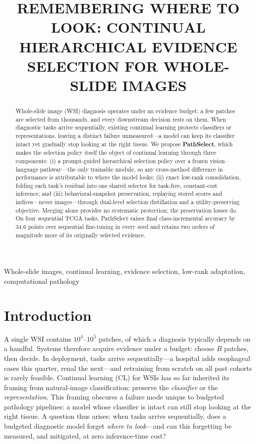 \documentclass{article}
\title{REMEMBERING WHERE TO LOOK: CONTINUAL HIERARCHICAL EVIDENCE SELECTION FOR WHOLE-SLIDE IMAGES}
\begin{document}
\ninept %
%
\maketitle
%
\begin{abstract}
Whole-slide image (WSI) diagnosis operates under an evidence budget: a few patches are selected from thousands, and every downstream decision rests on them. When diagnostic tasks arrive sequentially, existing continual learning protects classifiers or representations, leaving a distinct failure unmeasured---a model can keep its classifier intact yet gradually stop looking at the right tissue. We propose \textbf{PathSelect}, which makes the selection policy itself the object of continual learning through three components: (i) a prompt-guided hierarchical selection policy over a frozen vision--language pathway---the only trainable module, so any cross-method difference in performance is attributable to where the model looks; (ii) exact low-rank consolidation, folding each task's residual into one shared selector for task-free, constant-cost inference; and (iii) behavioral-snapshot preservation, replaying stored scores and indices---never images---through dual-level selection distillation and a utility-preserving objective. Merging alone provides no systematic protection; the preservation losses do. On four sequential TCGA tasks, PathSelect raises final class-incremental accuracy by 34.6 points over sequential fine-tuning in every seed and retains two orders of magnitude more of its originally selected evidence.
\end{abstract}
%
\begin{keywords}
Whole-slide images, continual learning, evidence selection, low-rank adaptation, computational pathology
\end{keywords}
%
\section{Introduction}
\label{sec:intro}
A single WSI contains $10^4$--$10^5$ patches, of which a diagnosis typically depends on a handful. Systems therefore acquire evidence under a budget: choose $B$ patches, then decide. In deployment, tasks arrive sequentially---a hospital adds esophageal cases this quarter, renal the next---and retraining from scratch on all past cohorts is rarely feasible. Continual learning (CL) for WSIs has so far inherited its framing from natural-image classification: preserve the \emph{classifier} or the \emph{representation}. This framing obscures a failure mode unique to budgeted pathology pipelines: a model whose classifier is intact can still stop looking at the right tissue. A question thus arises: when tasks arrive sequentially, does a budgeted diagnostic model forget \emph{where to look}---and can this forgetting be measured, and mitigated, at zero inference-time cost?
\end{document}
